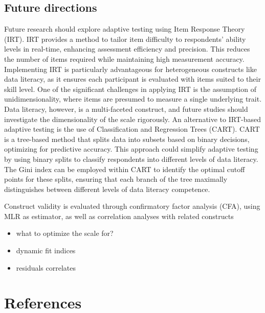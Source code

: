 \documentclass[
  12pt,
  a4paper,
  twoside]{article}
\providecommand{\tightlist}{%
  \setlength{\itemsep}{0pt}\setlength{\parskip}{0pt}}
\begin{document}
\subsection{Future directions}\label{future-directions}

Future research should explore adaptive testing using Item Response Theory (IRT). IRT provides a method to tailor item difficulty to respondents' ability levels in real-time, enhancing assessment efficiency and precision. This reduces the number of items required while maintaining high measurement accuracy. Implementing IRT is particularly advantageous for heterogeneous constructs like data literacy, as it ensures each participant is evaluated with items suited to their skill level. One of the significant challenges in applying IRT is the assumption of unidimensionality, where items are presumed to measure a single underlying trait. Data literacy, however, is a multi-faceted construct, and future studies should investigate the dimensionality of the scale rigorously.
An alternative to IRT-based adaptive testing is the use of Classification and Regression Trees (CART). CART is a tree-based method that splits data into subsets based on binary decisions, optimizing for predictive accuracy. This approach could simplify adaptive testing by using binary splits to classify respondents into different levels of data literacy. The Gini index can be employed within CART to identify the optimal cutoff points for these splits, ensuring that each branch of the tree maximally distinguishes between different levels of data literacy competence.

Construct validity is evaluated through confirmatory factor analysis (CFA), using MLR as estimator, as well as correlation analyses with related constructs

\begin{itemize}
\tightlist
\item
  what to optimize the scale for?
\item
  dynamic fit indices
\item
  residuals correlates
\end{itemize}

\section*{References}\label{references}
\end{document}
